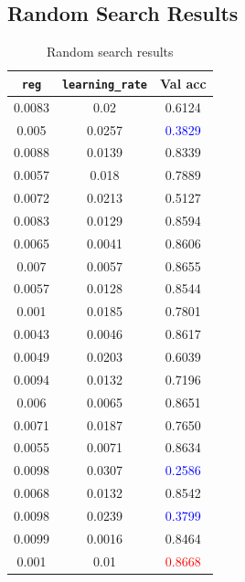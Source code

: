 \documentclass[10pt,a4paper,twoside]{tau}
\begin{document}
\newpage
\subsection{Random Search Results} \label{subsec:random-table}
\begin{table}[h]
    \centering
    \begin{tabular}{|c|c|c|}
        \hline
        \texttt{reg} & \texttt{learning\_rate} & Val acc\\ \hline
        0.0083 & 0.02 & 0.6124 \\ \hline
        0.005 & 0.0257  & \textcolor{blue}{0.3829} \\ \hline
        0.0088 & 0.0139   & 0.8339 \\ \hline
        0.0057  & 0.018 & 0.7889 \\ \hline
        0.0072  & 0.0213  & 0.5127 \\ \hline
        0.0083  & 0.0129   & 0.8594 \\ \hline
        0.0065   & 0.0041 & 0.8606 \\ \hline
        0.007   & 0.0057  & 0.8655 \\ \hline
        0.0057   & 0.0128   & 0.8544 \\ \hline
        0.001 & 0.0185 & 0.7801 \\ \hline
        0.0043 & 0.0046  & 0.8617 \\ \hline
        0.0049 & 0.0203   & 0.6039 \\ \hline
        0.0094  & 0.0132 & 0.7196 \\ \hline
        0.006  & 0.0065  & 0.8651 \\ \hline
        0.0071  & 0.0187   & 0.7650 \\ \hline
        0.0055   & 0.0071 & 0.8634 \\ \hline
        0.0098   & 0.0307  & \textcolor{blue}{0.2586} \\ \hline
        0.0068   & 0.0132   & 0.8542 \\ \hline
        0.0098 & 0.0239 & \textcolor{blue}{0.3799} \\ \hline
        0.0099 & 0.0016  & 0.8464 \\ \hline
        0.001 & 0.01   & \textcolor{red}{0.8668} \\ \hline
    \end{tabular}
    \caption{Random search results}
    \label{tab:random-search-results}
\end{table}
					

\printbibliography

\end{document}
